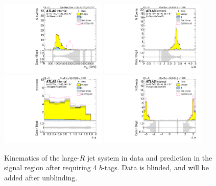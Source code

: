 \begin{figure}[htbp!]
\begin{center}
\includegraphics[angle=270, width=0.45\textwidth]{./figures/boosted/Signal/b77_FourTag_Signal_mHH_l_blind.pdf}
\includegraphics[angle=270, width=0.45\textwidth]{./figures/boosted/Signal/b77_FourTag_Signal_hCandDr_blind.pdf}\\
\includegraphics[angle=270, width=0.45\textwidth]{./figures/boosted/Signal/b77_FourTag_Signal_hCandDeta_blind.pdf}
\includegraphics[angle=270, width=0.45\textwidth]{./figures/boosted/Signal/b77_FourTag_Signal_hCandDphi_blind.pdf}
  \caption{Kinematics of the large-$R$ jet system in data and prediction in the signal region after requiring 4 $b$-tags. Data is blinded, and will be added after unblinding. }
  \label{fig:boosted-4b-signal-blind-ak10-system}
\end{center}
\end{figure}


